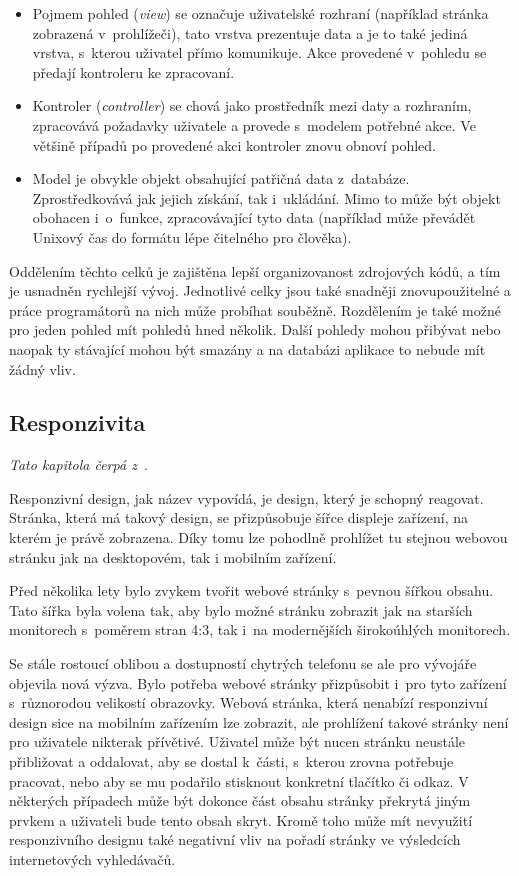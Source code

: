 \begin{itemize}
\item Pojmem pohled (\emph{view}) se označuje uživatelské rozhraní (například stránka zobrazená v~prohlížeči), tato vrstva prezentuje data a je to také jediná vrstva, s~kterou uživatel přímo komunikuje. Akce provedené v~pohledu se předají kontroleru ke zpracovaní.
\item Kontroler (\emph{controller}) se chová jako prostředník mezi daty a rozhraním, zpracovává požadavky uživatele a provede s~modelem potřebné akce. Ve většině případů po provedené akci kontroler znovu obnoví pohled.
\item Model je obvykle objekt obsahující patřičná data z~databáze. Zprostředkovává jak jejich získání, tak i~ukládání. Mimo to může být objekt obohacen i~o~funkce, zpracovávající tyto data (například může převádět Unixový čas do formátu lépe čitelného pro člověka). 
\end{itemize}


Oddělením těchto celků je zajištěna lepší organizovanost zdrojových kódů, a tím je usnadněn rychlejší vývoj. Jednotlivé celky jsou také snadněji znovupoužitelné a práce programátorů na nich může probíhat souběžně. Rozdělením je také možné pro jeden pohled mít pohledů hned několik. Další pohledy mohou přibývat nebo naopak ty stávající mohou být smazány a na databázi aplikace to nebude mít žádný vliv.


\subsection{Responzivita}
\emph{Tato kapitola čerpá z~\cite{bib:responsive}}.

Responzivní design, jak název vypovídá, je design, který je schopný reagovat. Stránka, která má takový design, se přizpůsobuje šířce displeje zařízení, na kterém je právě zobrazena. Díky tomu lze pohodlně prohlížet tu stejnou webovou stránku jak na desktopovém, tak i mobilním zařízení. 

Před několika lety bylo zvykem tvořit webové stránky s~pevnou šířkou obsahu. Tato šířka byla volena tak, aby bylo možné stránku zobrazit jak na starších monitorech s~poměrem stran 4:3, tak i~na modernějších širokoúhlých monitorech. 

Se stále rostoucí oblibou a dostupností chytrých telefonu se ale pro vývojáře objevila nová výzva. Bylo potřeba webové stránky přizpůsobit i~pro tyto zařízení s~různorodou velikostí obrazovky. Webová stránka, která nenabízí responzivní design sice na mobilním zařízením lze zobrazit, ale prohlížení takové stránky není pro uživatele nikterak přívětivé. Uživatel může být nucen stránku neustále přibližovat a oddalovat, aby se dostal k~části, s~kterou zrovna potřebuje pracovat, nebo aby se mu podařilo stisknout konkretní tlačítko či odkaz. V některých případech může být dokonce část obsahu stránky překrytá jiným prvkem a uživateli bude tento obsah skryt. Kromě toho může mít nevyužití responzivního designu také negativní vliv na pořadí stránky ve výsledcích internetových vyhledávačů.

